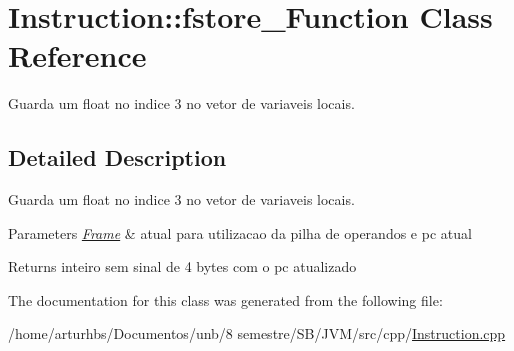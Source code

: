 \hypertarget{classInstruction_1_1fstore__3Function}{}\section{Instruction\+:\+:fstore\+\_\+Function Class Reference}
\label{classInstruction_1_1fstore__3Function}


Guarda um float no indice 3 no vetor de variaveis locais.  




\subsection{Detailed Description}
Guarda um float no indice 3 no vetor de variaveis locais. 


\begin{DoxyParams}{Parameters}
{\em \hyperlink{classFrame}{Frame}} & atual para utilizacao da pilha de operandos e pc atual \\
\hline
\end{DoxyParams}
\begin{DoxyReturn}{Returns}
inteiro sem sinal de 4 bytes com o pc atualizado 
\end{DoxyReturn}


The documentation for this class was generated from the following file\+:\begin{DoxyCompactItemize}
\item 
/home/arturhbs/\+Documentos/unb/8 semestre/\+S\+B/\+J\+V\+M/src/cpp/\hyperlink{Instruction_8cpp}{Instruction.\+cpp}\end{DoxyCompactItemize}
